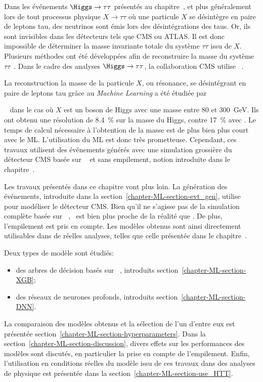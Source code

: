 \par
Dans les événements $\Higgs\to\tau\tau$ présentés au chapitre~,
et plus généralement lors de tout processus physique $X\to\tau\tau$ où une particule $X$ se désintègre en paire de leptons tau,
des neutrinos sont émis lors des désintégrations des taus.
Or, ils sont invisibles dans les détecteurs tels que CMS ou ATLAS.
Il est donc impossible de déterminer la masse invariante totale du système $\tau\tau$ issu de $X$.
Plusieurs méthodes ont été développées afin de reconstruire la masse du système $\tau\tau$~\cite{ELAGIN2011481,Barr_2011,Gripaios_2013}.
Dans le cadre des analyses $\Higgs\to\tau\tau$, la collaboration CMS utilise \SVFIT~\cite{SVFit_Bianchini_2014}.
\par
La reconstruction la masse de la particule $X$, ou résonance, se désintégrant en paire de leptons tau grâce au \emph{Machine Learning}
a été étudiée par \author{BARTSCHI201929}~\cite{BARTSCHI201929} dans le cas où $X$ est un boson de Higgs avec une masse entre \num{80} et \SI{300}{\GeV}.
Ils ont obtenu une résolution de \SI{8.4}{\%} sur la masse du Higgs, contre \SI{17}{\%} avec \SVFIT.
Le temps de calcul nécessaire à l'obtention de la masse est de plus bien plus court avec le ML.
L'utilisation du ML est donc très prometteuse.
Cependant,
ces travaux utilisent des événements générés
avec une simulation grossière du détecteur CMS basée sur
\DELPHES~\cite{Delphes,Delphes_additions}
et sans empilement, notion introduite dans le chapitre~.
\par
Les travaux présentés dans ce chapitre vont plus loin.
La génération des événements, introduite dans la section~\ref{chapter-ML-section-evt_gen},
utilise \FASTSIM~\cite{FastSim_2011,FastSim_2014,FastSim_2017_1,FastSim_2017_2}
pour modéliser le détecteur CMS.
Bien qu'il ne s'agisse pas de la simulation complète basée sur \GEANTfour~\cite{geant4_2003,geant4_2006,geant4_2016},
\FASTSIM\ est bien plus proche de la réalité que \DELPHES.
De plus, l'empilement est pris en compte.
Les modèles obtenus sont ainsi directement utilisables dans de réelles analyses, telles que celle présentée dans le chapitre~.
\par
Deux types de modèle sont étudiés:
\begin{itemize}
\item des arbres de décision basés sur \XGB~\cite{xgboost}, introduits section~\ref{chapter-ML-section-XGB};
\item des réseaux de neurones profonds, introduits section~\ref{chapter-ML-section-DNN}.
\end{itemize}
La comparaison des modèles obtenus et la sélection de l'un d'entre eux est présentée section~\ref{chapter-ML-section-hyperparameters}.
Dans la section~\ref{chapter-ML-section-discussion},
divers effets sur les performances des modèles sont discutés,
en particulier la prise en compte de l'empilement.
Enfin, l'utilisation en conditions réelles du modèle issu de ces travaux dans des analyses de physique est présentée dans la section~\ref{chapter-ML-section-use_HTT}.
